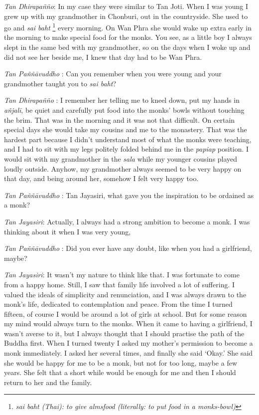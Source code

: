 \emph{Tan Dhirapañño}: In my case they were similar to Tan Joti. When I
was young I grew up with my grandmother in Chonburi, out in the
countryside. She used to go and \emph{sai baht} \footnote{\emph{sai baht
  (Thai): to give almsfood (literally: to put food in a monks-bowl)}}
every morning. On Wan Phra she would wake up extra early in the morning
to make special food for the monks. You see, as a little boy I always
slept in the same bed with my grandmother, so on the days when I woke up
and did not see her beside me, I knew that day had to be Wan Phra.

\emph{Tan Paññāvuddho} : Can you remember when you were young and your
grandmother taught you to \emph{sai baht}?

\emph{Tan Dhirapañño} : I remember her telling me to kneel down, put my
hands in \emph{añjalī}, be quiet and carefully put food into the monks'
bowls without touching the brim. That was in the morning and it was not
that difficult. On certain special days she would take my cousins and me
to the monastery. That was the hardest part because I didn't understand
most of what the monks were teaching, and I had to sit with my legs
politely folded behind me in the \emph{papiap} position. I would sit
with my grandmother in the \emph{sala} while my younger cousins played
loudly outside. Anyhow, my grandmother always seemed to be very happy on
that day, and being around her, somehow I felt very happy too.

\emph{Tan Paññāvuddho} : Tan Jayasiri, what gave you the inspiration to
be ordained as a monk?

\emph{Tan Jayasiri}: Actually, I always had a strong ambition to become
a monk. I was thinking about it when I was very young,

\emph{Tan Paññāvuddho} : Did you ever have any doubt, like when you had
a girlfriend, maybe?

\emph{Tan Jayasiri}: It wasn't my nature to think like that. I was
fortunate to come from a happy home. Still, I saw that family life
involved a lot of suffering. I valued the ideals of simplicity and
renunciation, and I was always drawn to the monk's life, dedicated to
contemplation and peace. From the time I turned fifteen, of course I
would be around a lot of girls at school. But for some reason my mind
would always turn to the monks. When it came to having a girlfriend, I
wasn't averse to it, but I always thought that I should practise the
path of the Buddha first. When I turned twenty I asked my mother's
permission to become a monk immediately. I asked her several times, and
finally she said `Okay.' She said she would be happy for me to be a
monk, but not for too long, maybe a few years. She felt that a short
while would be enough for me and then I should return to her and the
family.

